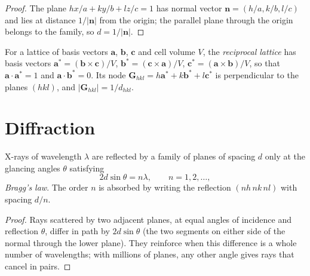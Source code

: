\begin{proof}
The plane $hx/a + ky/b + lz/c = 1$ has normal vector $\mathbf n = (h/a, k/b, l/c)$
and lies at distance $1/|\mathbf n|$ from the origin; the parallel plane through
the origin belongs to the family, so $d = 1/|\mathbf n|$.
\end{proof}

\begin{definition}\label{def:b3:x-ray-diffraction:reciprocal}
For a lattice of basis vectors $\mathbf a$, $\mathbf b$, $\mathbf c$ and cell volume $V$,
the \emph{reciprocal lattice} has basis vectors
$\mathbf a^* = (\mathbf b\times\mathbf c)/V$, $\mathbf b^* = (\mathbf c\times\mathbf a)/V$,
$\mathbf c^* = (\mathbf a\times\mathbf b)/V$, so that $\mathbf a\cdot\mathbf a^* = 1$ and
$\mathbf a\cdot\mathbf b^* = 0$. Its node $\mathbf G_{hkl} = h\mathbf a^* + k\mathbf b^* + l\mathbf c^*$ is
perpendicular to the planes $(hkl)$, and $|\mathbf G_{hkl}| = 1/d_{hkl}$.
\end{definition}

\section{Diffraction}

\begin{theorem}\label{thm:b3:x-ray-diffraction:bragg}
X-rays of wavelength $\lambda$ are reflected by a family of planes of spacing $d$
only at the glancing angles $\theta$ satisfying
\[
2d\sin\theta = n\lambda, \qquad n = 1, 2, \dots,
\]
\emph{Bragg's law}. The order $n$ is absorbed by writing the
reflection $(nh\,nk\,nl)$ with spacing $d/n$.
\end{theorem}

\begin{proof}
Rays scattered by two adjacent planes, at equal angles of incidence and
reflection $\theta$, differ in path by $2d\sin\theta$ (the two segments on either side
of the normal through the lower plane). They reinforce when this difference is
a whole number of wavelengths; with millions of planes, any other angle gives
rays that cancel in pairs.
\end{proof}

